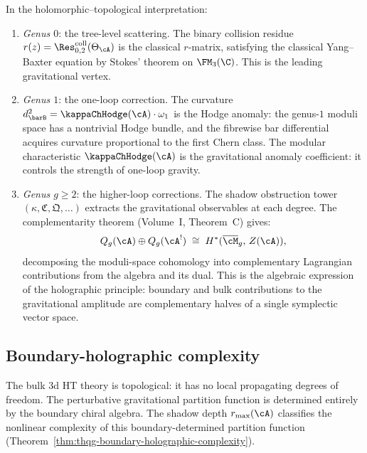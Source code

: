 In the holomorphic--topological interpretation:
\begin{enumerate}[label=\textup{(\alph*)}]
\item \emph{Genus $0$}: the tree-level scattering. The binary
 collision residue $r(z) = \Res^{\mathrm{coll}}_{0,2}(\Theta_\cA)$
 is the classical $r$-matrix, satisfying the classical Yang--Baxter
 equation by Stokes' theorem on $\FM_3(\C)$. This is the leading
 gravitational vertex.

\item \emph{Genus $1$}: the one-loop correction. The curvature
 $d_{\barB}^2 = \kappaChHodge(\cA) \cdot \omega_1$ is the Hodge anomaly:
 the genus-$1$ moduli space has a nontrivial Hodge bundle, and the
 fibrewise bar differential acquires curvature proportional to the first Chern
 class. The modular characteristic $\kappaChHodge(\cA)$ is the
 gravitational anomaly coefficient: it controls the strength
 of one-loop gravity.

\item \emph{Genus $g \ge 2$}: the higher-loop corrections. The
 shadow obstruction tower $(\kappa, \mathfrak{C}, \mathfrak{Q}, \ldots)$
 extracts the gravitational observables at each degree. The
 complementarity theorem (Volume~I, Theorem~C) gives:
 \[
 Q_g(\cA) \oplus Q_g(\cA^!)
 \;\cong\;
 H^*(\overline{\cM}_g,\, Z(\cA)),
 \]
 decomposing the moduli-space cohomology into complementary
 Lagrangian contributions from the algebra and its dual.
 This is the algebraic expression of the holographic principle:
 boundary and bulk contributions to the gravitational amplitude
 are complementary halves of a single symplectic vector space.
\end{enumerate}

\subsection{Boundary-holographic complexity}

The bulk 3d HT theory is topological: it has no local propagating
degrees of freedom. The perturbative gravitational partition
function is determined entirely by the boundary chiral algebra.
The shadow depth $r_{\max}(\cA)$ classifies the nonlinear
complexity of this boundary-determined partition function
(Theorem~\ref{thm:thqg-boundary-holographic-complexity}).

